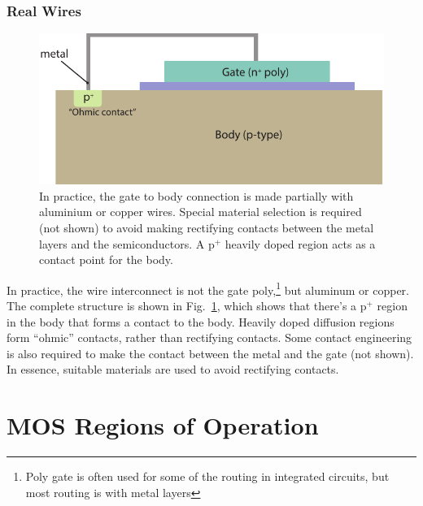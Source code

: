 \subsubsection{Real Wires}
\begin{figure}[tbh]
\centering
\includegraphics[width=.75\columnwidth]{mos_cap_metal_short}
\caption{In practice, the gate to body connection is made partially with aluminium or copper wires.  Special material selection is required (not shown) to avoid making rectifying contacts between the metal layers and the semiconductors.  A p$^+$ heavily doped region acts as a contact point for the body. } \label{fig:mos_cap_gate_body_short_wire}
\end{figure}
In practice, the wire interconnect is not the gate poly,\footnote{Poly gate is often used for some of the routing in integrated circuits, but most routing is with metal layers}  but aluminum or copper.  The complete structure is shown in Fig.~\ref{fig:mos_cap_gate_body_short_wire}, which shows that there's a p$^+$ region in the body that forms a contact to the body.  Heavily doped diffusion regions form “ohmic” contacts, rather than rectifying contacts.   Some contact engineering is also required to make the contact between the metal and the gate (not shown). In essence, suitable materials are used to avoid rectifying contacts.  
\section{MOS Regions of Operation}
